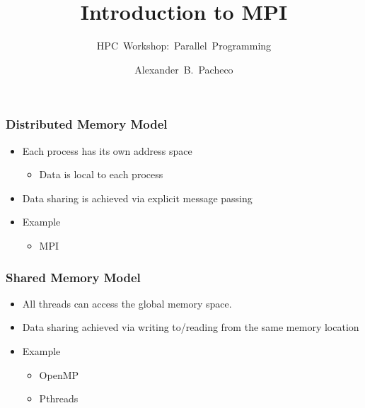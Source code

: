 \documentclass[9pt,c]{beamer}
\title[MPI]{Introduction to MPI}
\subtitle{HPC~Workshop:~Parallel~Programming}
\author{\large{Alexander~B.~Pacheco}}
\institute[Lehigh University Research Computing]{\href{http://researchcomputing.lehigh.edu}{Research~Computing}}
\date{}%
\begin{document}
\begin{frame}
  \titlepage
\end{frame}

\begin{frame}
  \frametitle{Distributed Memory Model}
    \begin{itemize}
      \item Each process has its own address space
      \begin{itemize}
        \item Data is local to each process
      \end{itemize}
      \item Data sharing is achieved via explicit message passing
      \item Example
      \begin{itemize}
        \item MPI
      \end{itemize}
    \end{itemize}

    
\end{frame}

\begin{frame}
  \frametitle{Shared Memory Model}
    \begin{itemize}
      \item All threads can access the global memory space.
      \item Data sharing achieved via writing to/reading from the same memory location
      \item Example
      \begin{itemize}
        \item OpenMP
        \item Pthreads
      \end{itemize}
    \end{itemize}
    
\end{frame}
\end{document}
